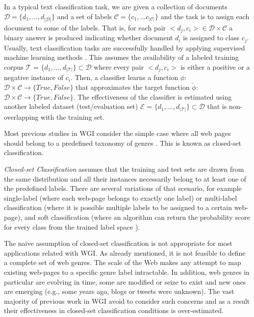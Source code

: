 In a typical text classification task, we are given a collection of documents $\mathcal{D}=\{d_1,\dots,d_{|\mathcal{D}|}\}$ and a set of labels $\mathcal{C}= \{c_1, \dots c_{|\mathcal{C}|} \}$ and the task is to assign each document to some of the labels. That is, for each pair $<d_j,c_i>\in \mathcal{D}\times \mathcal{C}$ a binary answer is produced indicating whether document $d_i$ is assigned to class $c_j$. Usually, text classification tasks are successfully handled by applying supervised machine learning methods \parencite{sebastiani2002}. This assumes the availability of a labeled training corpus $\mathcal{T}$ = $\{d_1,\dots, d_{|\mathcal{T}|}\} \subset \mathcal{D}$ where every pair $<d_j,c_i>$ is either a positive or a negative instance of $c_i$. Then, a classifier learns a function $\phi$:$\mathcal{D}\times\mathcal{C}\rightarrow \{True, False\}$ that approximates the target function $\check{\phi}$:$\mathcal{D}\times\mathcal{C}\rightarrow \{True, False\}$. The effectiveness of the classifier is estimated using another labeled dataset (test/evaluation set) $\mathcal{E}$ = $\{d_1,\dots, d_{|\mathcal{T}|}\} \subset \mathcal{D}$ that is non-overlapping with the training set.

Most previous studies in WGI consider the simple case where all web pages should belong to a predefined taxonomy of genres \parencite{Lim2005,santini2007automatic,kanaris2009learning,jebari2014pure_URL}. This is known as closed-set classification.

\begin{definition}{\textit{Closed-set Classification}}
assumes that the training and test sets are drawn from the same distribution and all their instances necessarily belong to at least one of the predefined labels. There are several variations of that scenario, for example single-label (where each web-page belongs to exactly one label) or multi-label classification (where it is possible multiple labels to be assigned to a certain web-page), and soft classification (where an algorithm can return the probability score for every class from the trained label space \parencite{geng2018recent}).
\end{definition}

The naive assumption of closed-set classification is not appropriate for most applications related with WGI. As already mentioned, it is not feasible to define a complete set of web genres. The scale of the Web makes any attempt to map existing web-pages to a specific genre label intractable. In addition, web genres in particular are evolving in time, some are modified or seize to exist and new ones are emerging (e.g., some years ago, blogs or tweets were unknown). The vast majority of previous work in WGI avoid to consider such concerns and as a result their effectiveness in closed-set classification conditions is over-estimated.

